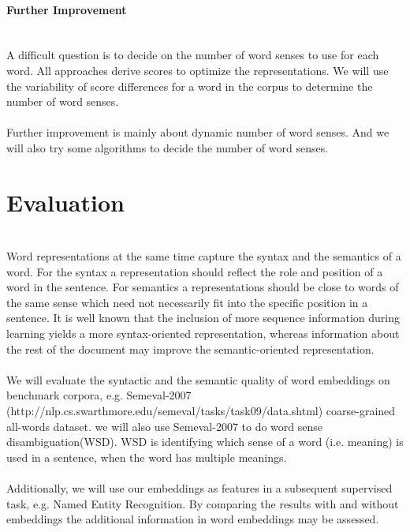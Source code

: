 \documentclass{scrartcl}
\begin{document}
\paragraph{Further Improvement}
\hfill \\
A difficult question is to decide on the number of word senses to use for each word. All approaches derive scores to optimize the representations. We will use the variability of score differences for a word in the corpus to determine the number of word senses.    \\
\\
Further improvement is mainly about dynamic number of word senses. And we will also try some algorithms to decide the number of word senses.\\

\section{Evaluation}
\paragraph{}
\hfill \\
Word representations at the same time capture the syntax and the semantics of a word. For the syntax a representation should reflect the role and position of a word in the sentence. For semantics a representations should be close to words of the same sense which need not necessarily fit into the specific position in a sentence. It is well known that the inclusion of more sequence information during learning yields a more syntax-oriented representation, whereas information about the rest of the document may improve the semantic-oriented representation.\\
\\
We will evaluate the syntactic and the semantic quality of word embeddings on benchmark corpora, e.g. Semeval-2007 (http://nlp.cs.swarthmore.edu/semeval/tasks/task09/data.shtml) coarse-grained all-words dataset. we will also use Semeval-2007 to do word sense disambiguation(WSD). WSD is identifying which sense of a word (i.e. meaning) is used in a sentence, when the word has multiple meanings.\\
\\
Additionally, we will use our embeddings as features in a subsequent supervised task, e.g. Named Entity Recognition. By comparing the results with and without embeddings the additional information in word embeddings may be assessed.\\
\end{document}
